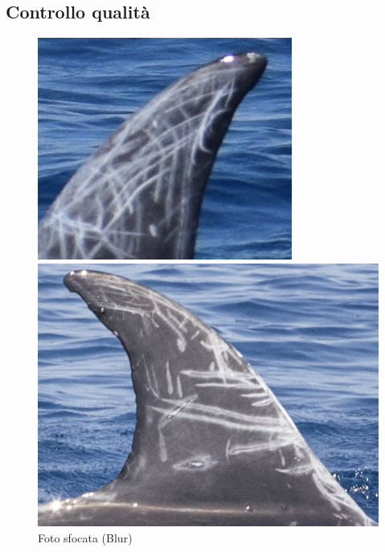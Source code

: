 \documentclass[a4paper,12pt]{report}
\begin{document}
    \subsection{Controllo qualità}
    \begin{figure}[H]
      \centering
      \begin{minipage}{0.3\textwidth}
        \centering
        \includegraphics[width=\textwidth]{assets/images/methods/porting/quality_control/blur.png}  
        \caption{Foto sfocata (Blur)}
      \end{minipage}
      \begin{minipage}{0.3\textwidth}
        \centering
        \includegraphics[width=\textwidth]{assets/images/methods/porting/quality_control/contrast.png}   

\end{minipage}
\end{figure}
\end{document}
